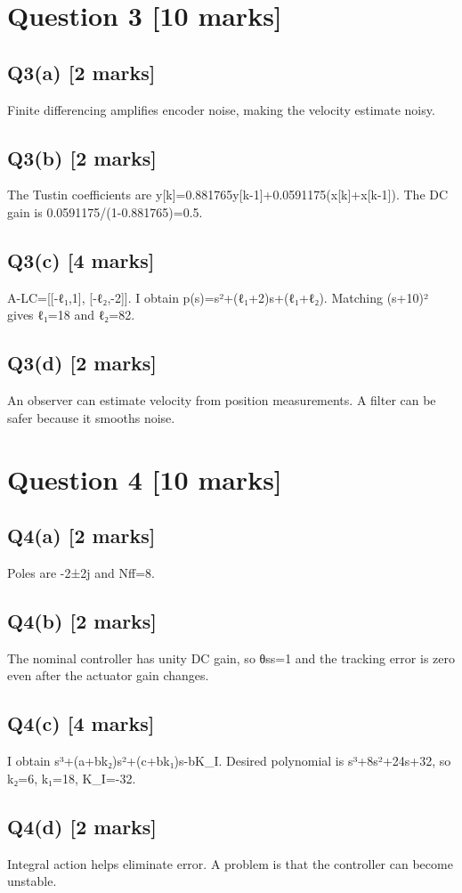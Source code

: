 \documentclass[11pt,a4paper]{article}
\begin{document}
\section*{Question 3 \hfill [10 marks]}
\subsection*{Q3(a) \hfill [2 marks]}

Finite differencing amplifies encoder noise, making the velocity estimate noisy.

\subsection*{Q3(b) \hfill [2 marks]}

The Tustin coefficients are y[k]=0.881765y[k-1]+0.0591175(x[k]+x[k-1]).
The DC gain is 0.0591175/(1-0.881765)=0.5.

\subsection*{Q3(c) \hfill [4 marks]}

A-LC=[[-ℓ₁,1], [-ℓ₂,-2]].
I obtain p(s)=s²+(ℓ₁+2)s+(ℓ₁+ℓ₂).
Matching (s+10)² gives ℓ₁=18 and ℓ₂=82.

\subsection*{Q3(d) \hfill [2 marks]}

An observer can estimate velocity from position measurements.
A filter can be safer because it smooths noise.

\section*{Question 4 \hfill [10 marks]}
\subsection*{Q4(a) \hfill [2 marks]}

Poles are -2±2j and Nff=8.

\subsection*{Q4(b) \hfill [2 marks]}

The nominal controller has unity DC gain, so θss=1 and the tracking error is zero even after the actuator gain changes.

\subsection*{Q4(c) \hfill [4 marks]}

I obtain s³+(a+bk₂)s²+(c+bk₁)s-bK\_I.
Desired polynomial is s³+8s²+24s+32, so k₂=6, k₁=18, K\_I=-32.

\subsection*{Q4(d) \hfill [2 marks]}

Integral action helps eliminate error.
A problem is that the controller can become unstable.
\end{document}
